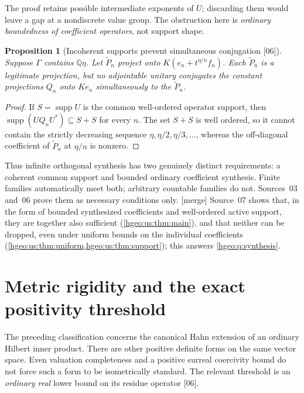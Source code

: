 \documentclass[11pt,letterpaper]{article}
\numberwithin{equation}{section}
\newtheorem{proposition}[proposition]{Proposition}
\theoremstyle{definition}
\theoremstyle{remark}
\newcommand{\Q}{\mathbb Q}
\newcommand{\K}{K}
\newcommand{\supp}{\operatorname{supp}}
\newcommand{\src}[1]{\textup{\textsf{\small[#1]}}}
\newcommand{\mergetag}{\textup{\textsf{\small[merge]}}}
\begin{document}
The proof retains possible intermediate exponents of $U$; discarding them
would leave a gap at a nondiscrete value group. The obstruction here is
\emph{ordinary boundedness of coefficient operators}, not support shape.

\begin{proposition}[Incoherent supports prevent simultaneous conjugation
\src{06}]\label{hgeo:prop:incoherent}
Suppose $\Gamma$ contains $\Q\eta$. Let $\widetilde P_n$ project onto
$\K(e_n+t^{\eta/n}f_n)$. Each $\widetilde P_n$ is a legitimate projection,
but no adjointable unitary conjugates the constant projections $Q_n$ onto
$\K e_n$ simultaneously to the $\widetilde P_n$.
\end{proposition}
\begin{proof}
If $S=\supp U$ is the common well-ordered operator support, then
$\supp(UQ_nU^*)\subseteq S+S$ for every $n$. The set $S+S$ is well
ordered, so it cannot contain the strictly decreasing sequence
$\eta,\eta/2,\eta/3,\ldots$, whereas the off-diagonal coefficient of
$\widetilde P_n$ at $\eta/n$ is nonzero.
\end{proof}

Thus infinite orthogonal synthesis has two genuinely distinct requirements:
a coherent common support and bounded ordinary coefficient synthesis.
Finite families automatically meet both; arbitrary countable families do
not. Sources~03 and~06 prove them as necessary conditions only. \mergetag{}
Source~07 shows that, in the form of bounded synthesized coefficients and
well-ordered active support, they are together also sufficient
(\cref{hgeo:us:thm:main}), and that neither can be dropped, even under
uniform bounds on the individual coefficients
(\cref{hgeo:us:thm:uniform,hgeo:us:thm:support}); this answers
\cref{hgeo:q:synthesis}.

\section{Metric rigidity and the exact positivity threshold}
\label{hgeo:sec:metric}

The preceding classification concerns the canonical Hahn extension of an
ordinary Hilbert inner product. There are other positive definite forms on
the same vector space. Even valuation completeness and a positive surreal
coercivity bound do not force such a form to be isometrically standard. The
relevant threshold is an \emph{ordinary real} lower bound on its residue
operator \src{06}.
\end{document}
